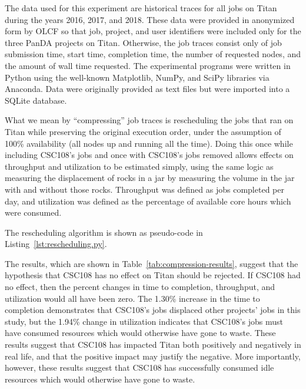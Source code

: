 The data used for this experiment are historical traces for all jobs on Titan
during the years 2016, 2017, and 2018. These data were provided in anonymized
form by OLCF so that job, project, and user identifiers were included only for
the three PanDA projects on Titan. Otherwise, the job traces consist only of
job submission time, start time, completion time, the number of requested
nodes, and the amount of wall time requested. The experimental programs were
written in Python using the well-known Matplotlib, NumPy, and SciPy libraries
via Anaconda. Data were originally provided as text files but were imported
into a SQLite database. 

What we mean by ``compressing'' job traces is rescheduling the jobs that ran
on Titan while preserving the original execution order, under the assumption of
100\% availability (all nodes up and running all the time). Doing this once
while including CSC108's jobs and once with CSC108's jobs removed allows
effects on throughput and utilization to be estimated simply, using the same
logic as measuring the displacement of rocks in a jar by measuring the volume
in the jar with and without those rocks. Throughput was defined as jobs
completed per day, and utilization was defined as the percentage of available
core hours which were consumed.

The rescheduling algorithm is shown as pseudo-code in
Listing~\ref{lst:rescheduling.py}.



The results, which are shown in Table~\ref{tab:compression-results}, suggest
that the hypothesis that CSC108 has no effect on Titan should be rejected. If
CSC108 had no effect, then the percent changes in time to completion,
throughput, and utilization would all have been zero. The 1.30\% increase in
the time to completion demonstrates that CSC108's jobs displaced other
projects' jobs in this study, but the 1.94\% change in utilization indicates
that CSC108's jobs must have consumed resources which would otherwise have gone
to waste. These results suggest that CSC108 has impacted Titan both positively
and negatively in real life, and that the positive impact may justify the
negative. More importantly, however, these results suggest that CSC108 has
successfully consumed idle resources which would otherwise have gone to waste.



